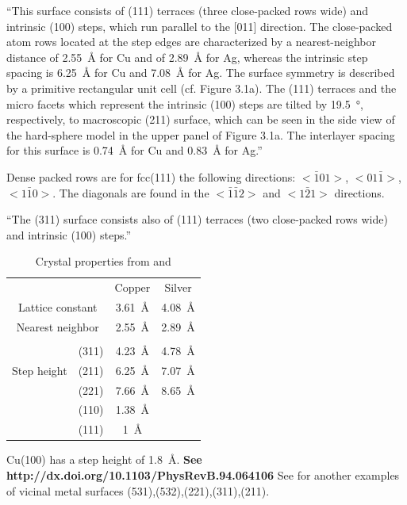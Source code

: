  
 ``This surface consists of (111) terraces (three close-packed rows wide) and intrinsic (100) steps, which run parallel to the [011] direction. The close-packed atom rows located at the step edges are characterized by
a nearest-neighbor distance of \SI{2.55}{\angstrom}  for Cu and of \SI{2.89}{\angstrom} for Ag, whereas the intrinsic step
spacing is \SI{6.25}{\angstrom} for Cu and \SI{7.08}{\angstrom} for Ag. The surface symmetry is described by a primitive
rectangular unit cell (cf. Figure 3.1a). The (111) terraces and the micro facets which represent the intrinsic (100) steps are tilted by \SI{19.5}{\degree}, respectively, to macroscopic (211) surface, which can be seen in the side view of the hard-sphere model in the upper panel of Figure 3.1a. The interlayer spacing for this surface is \SI{0.74}{\angstrom} for Cu and \SI{0.83}{\angstrom} for Ag.''

Dense packed rows are for fcc(111) the following directions: $<\bar 1 01>$, $<01\bar 1>$, $<1\bar 1 0>$. The diagonals are found in the $<\bar 1 \bar 1 2>$ and $<1\bar 2 1>$ directions.

``The (311) surface consists also of (111) terraces (two close-packed rows wide) and intrinsic (100) steps.''

\begin{table}\label{tab:crystal-prop}
\caption{Crystal properties from \cite[29ff]{riemann_ionic_2002} and \cite{liu_oxygen_2014}}
\centering
\begin{tabular}{cccc}
			&				& Copper 	 & Silver \\
\multicolumn{2}{c}{Lattice constant}			& \SI{3.61}{\angstrom} & \SI{4.08}{\angstrom} \\
\multicolumn{2}{c}{Nearest neighbor}			& \SI{2.55}{\angstrom} & \SI{2.89}{\angstrom} \\ \hline \\
\multirow{3}{*}{Step height}	& (311) & \SI{4.23}{\angstrom} & \SI{4.78}{\angstrom} \\
								& (211) & \SI{6.25}{\angstrom} & \SI{7.07}{\angstrom} \\
								& (221) & \SI{7.66}{\angstrom} & \SI{8.65}{\angstrom} \\
								& (110) & \SI{1.38}{\angstrom} & \\
								& (111) & \SI{1}{\angstrom} & \\
\end{tabular}
\end{table}
Cu(100) has a step height of \SI{1.8}{\angstrom}. \textbf{See http://dx.doi.org/10.1103/PhysRevB.94.064106}
See \cite{riemann_ionic_2002} for another examples of vicinal metal surfaces (531),(532),(221),(311),(211).

